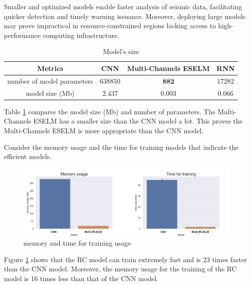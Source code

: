 Smaller and optimized models enable faster analysis of seismic data, facilitating quicker detection and timely warning issuance. Moreover, deploying large models may prove impractical in resource-constrained regions lacking access to high-performance computing infrastructure.

\begin{table}[ht]
\centering
\caption{Model's size}
\label{tab:modelsize}
\setlength{\tabcolsep}{3pt}
\begin{tabular}{|c|c|c|c|}
\hline
\textbf{Metrics}& \textbf{CNN}	& \textbf{Multi-Channels ESELM} & \textbf{RNN} \\
\hline
number of model parameters & $638850$ & $\pmb{882}$ & $17282$\\
model size (Mb) & $2.437$		& $\pmb{0.003}$& $0.066$\\
\hline
\end{tabular}
\end{table}

Table \ref{tab:modelsize} compares the model size (Mb) and number of parameters. The Multi-Channels ESELM has a smaller size than the CNN model a lot. This proves the Multi-Channels ESELM is more appropriate than the CNN model.

Consider the memory usage and the time for training models that indicate the efficient models.
\begin{figure}[ht]
    \centering
    \includegraphics[width=\textwidth]{img/mem_time.png}
    \caption{memory and time for training usage}
    \label{fig:memetime}
\end{figure}

Figure \ref{fig:memetime} shows that the RC model can train extremely fast and is 23 times faster than the CNN model. Moreover, the memory usage for the training of the RC model is 16 times less than that of the CNN model.\\



